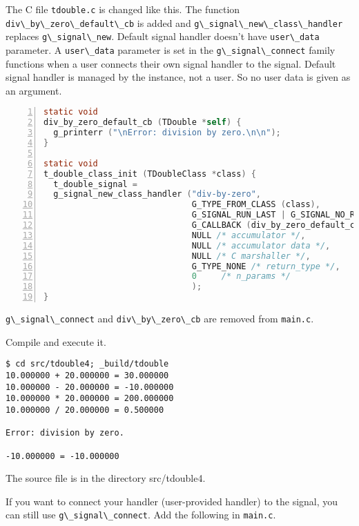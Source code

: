 The C file \passthrough{\lstinline!tdouble.c!} is changed like this. The
function \passthrough{\lstinline!div\_by\_zero\_default\_cb!} is added
and \passthrough{\lstinline!g\_signal\_new\_class\_handler!} replaces
\passthrough{\lstinline!g\_signal\_new!}. Default signal handler doesn't
have \passthrough{\lstinline!user\_data!} parameter. A
\passthrough{\lstinline!user\_data!} parameter is set in the
\passthrough{\lstinline!g\_signal\_connect!} family functions when a
user connects their own signal handler to the signal. Default signal
handler is managed by the instance, not a user. So no user data is given
as an argument.

\begin{lstlisting}[language=C, numbers=left]
static void
div_by_zero_default_cb (TDouble *self) {
  g_printerr ("\nError: division by zero.\n\n");
}

static void
t_double_class_init (TDoubleClass *class) {
  t_double_signal =
  g_signal_new_class_handler ("div-by-zero",
                              G_TYPE_FROM_CLASS (class),
                              G_SIGNAL_RUN_LAST | G_SIGNAL_NO_RECURSE | G_SIGNAL_NO_HOOKS,
                              G_CALLBACK (div_by_zero_default_cb),
                              NULL /* accumulator */,
                              NULL /* accumulator data */,
                              NULL /* C marshaller */,
                              G_TYPE_NONE /* return_type */,
                              0     /* n_params */
                              );
}
\end{lstlisting}

\passthrough{\lstinline!g\_signal\_connect!} and
\passthrough{\lstinline!div\_by\_zero\_cb!} are removed from
\passthrough{\lstinline!main.c!}.

Compile and execute it.

\begin{lstlisting}
$ cd src/tdouble4; _build/tdouble
10.000000 + 20.000000 = 30.000000
10.000000 - 20.000000 = -10.000000
10.000000 * 20.000000 = 200.000000
10.000000 / 20.000000 = 0.500000

Error: division by zero.

-10.000000 = -10.000000
\end{lstlisting}

The source file is in the directory src/tdouble4.

If you want to connect your handler (user-provided handler) to the
signal, you can still use \passthrough{\lstinline!g\_signal\_connect!}.
Add the following in \passthrough{\lstinline!main.c!}.

